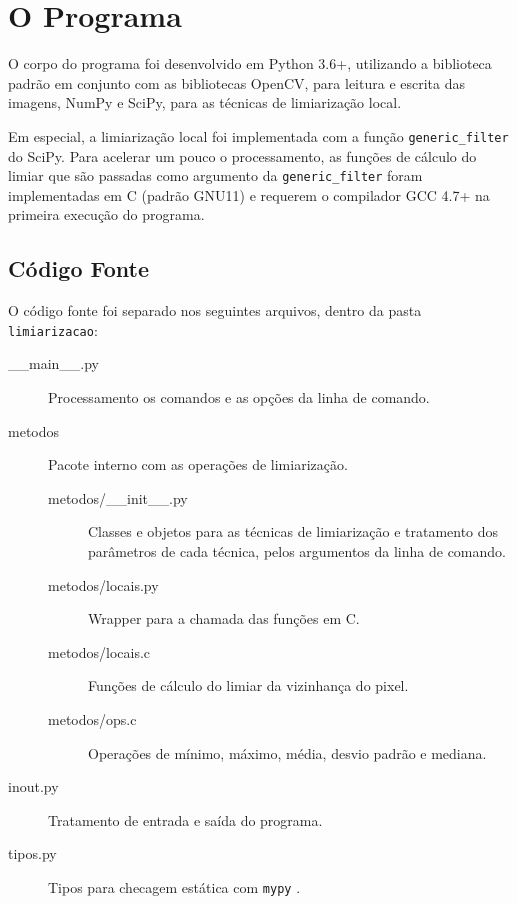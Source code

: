 \section{O Programa}

O corpo do programa foi desenvolvido em Python 3.6+, utilizando a biblioteca padrão em conjunto com as bibliotecas OpenCV, para leitura e escrita das imagens, NumPy e SciPy, para as técnicas de limiarização local.

Em especial, a limiarização local foi implementada com a função \texttt{generic_filter} \autocite{ref:genericfilter} do SciPy. Para acelerar um pouco o processamento, as funções de cálculo do limiar que são passadas como argumento da \texttt{generic_filter} foram implementadas em C (padrão GNU11) e requerem o compilador GCC 4.7+ na primeira execução do programa.

\subsection{Código Fonte}

    O código fonte foi separado nos seguintes arquivos, dentro da pasta \texttt{limiarizacao}:

    \begin{description}
        \item[\_\_main\_\_.py] Processamento os comandos e as opções da linha de comando.

        \item[metodos] Pacote interno com as operações de limiarização.

        \begin{description}
            \item[metodos/\_\_init\_\_.py] Classes e objetos para as técnicas de limiarização e tratamento dos parâmetros de cada técnica, pelos argumentos da linha de comando.

            \item[metodos/locais.py] Wrapper para a chamada das funções em C.

            \item[metodos/locais.c] Funções de cálculo do limiar da vizinhança do pixel.

            \item[metodos/ops.c] Operações de mínimo, máximo, média, desvio padrão e mediana.
        \end{description}

        \item[inout.py] Tratamento de entrada e saída do programa.

        \item[tipos.py] Tipos para checagem estática com \texttt{mypy} \autocite{ref:mypy}.
    \end{description}

